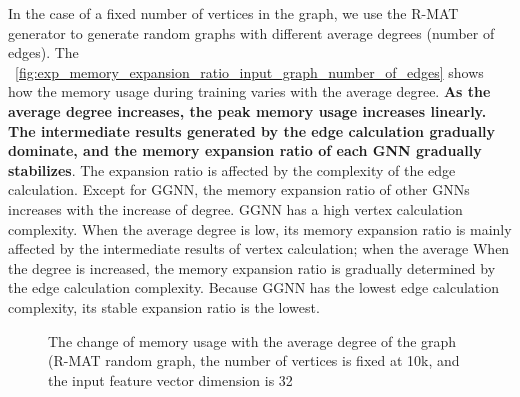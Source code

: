In the case of a fixed number of vertices in the graph, we use the R-MAT generator to generate random graphs with different average degrees (number of edges).
The \figurename~\ref{fig:exp_memory_expansion_ratio_input_graph_number_of_edges} shows how the memory usage during training varies with the average degree.
\textbf{As the average degree increases, the peak memory usage increases linearly.
    The intermediate results generated by the edge calculation gradually dominate, and the memory expansion ratio of each GNN gradually stabilizes}.
The expansion ratio is affected by the complexity of the edge calculation.
Except for GGNN, the memory expansion ratio of other GNNs increases with the increase of degree. GGNN has a high vertex calculation complexity.
When the average degree is low, its memory expansion ratio is mainly affected by the intermediate results of vertex calculation;
when the average When the degree is increased, the memory expansion ratio is gradually determined by the edge calculation complexity.
Because GGNN has the lowest edge calculation complexity, its stable expansion ratio is the lowest.

\begin{figure}
    \centering
    \caption{The change of memory usage with the average degree of the graph (R-MAT random graph, the number of vertices is fixed at 10k, and the input feature vector dimension is 32}
    \label{fig:exp_memory_expension_ratio_input_feature_dimension}
\end{figure}

